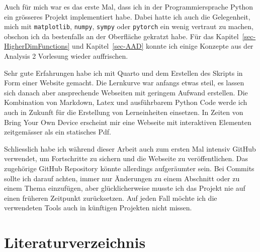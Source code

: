 \documentclass[
  a4paper,
  DIV=11]{scrreprt}
\theoremstyle{definition}
\theoremstyle{definition}
\theoremstyle{remark}
\begin{document}
Auch für mich war es das erste Mal, dass ich in der Programmiersprache
Python ein grösseres Projekt implementiert habe. Dabei hatte ich auch
die Gelegenheit, mich mit \texttt{matplotlib}, \texttt{numpy},
\texttt{sympy} oder \texttt{pytorch} ein wenig vertraut zu machen,
obschon ich da bestenfalls an der Oberfläche gekratzt habe. Für das
Kapitel~\ref{sec-HigherDimFunctions} und Kapitel~\ref{sec-AAD} konnte
ich einige Konzepte aus der Analysis 2 Vorlesung wieder auffrischen.

Sehr gute Erfahrungen habe ich mit Quarto und dem Erstellen des Skripts
in Form einer Website gemacht. Die Lernkurve war anfangs etwas steil, es
lassen sich danach aber ansprechende Webseiten mit geringem Aufwand
erstellen. Die Kombination von Markdown, Latex und ausführbarem Python
Code werde ich auch in Zukunft für die Erstellung von Lerneinheiten
einsetzen. In Zeiten von Bring Your Own Device erscheint mir eine
Webseite mit interaktiven Elementen zeitgemässer als ein statisches Pdf.

Schliesslich habe ich während dieser Arbeit auch zum ersten Mal intensiv
GitHub verwendet, um Fortschritte zu sichern und die Webseite zu
veröffentlichen. Das zugehörige GitHub Repository könnte allerdings
aufgeräumter sein. Bei Commits sollte ich darauf achten, immer nur
Änderungen zu einem Abschnitt oder zu einem Thema einzufügen, aber
glücklicherweise musste ich das Projekt nie auf einen früheren Zeitpunkt
zurücksetzen. Auf jeden Fall möchte ich die verwendeten Tools auch in
künftigen Projekten nicht missen.


\hypertarget{literaturverzeichnis}{%
\chapter*{Literaturverzeichnis}\label{literaturverzeichnis}}

\end{document}
